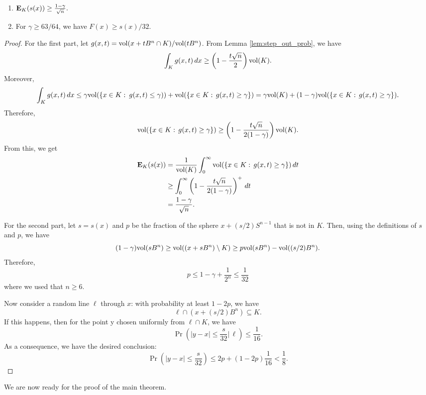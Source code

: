\begin{enumerate}
\item $\mathbf{E}_{K}(s(x))\ge\frac{1-\gamma}{\sqrt{n}}.$
\item For $\gamma\ge63/64$, we have $F(x)\ge s(x)/32.$
\end{enumerate}
\begin{proof}
For the first part, let $g(x,t)=\mathrm{vol}(x+tB^{n}\cap K)/\mathrm{vol}(tB^{n})$.
From Lemma \ref{lem:step_out_prob}, we have
\[
\int_{K}g(x,t)\,dx\ge\left(1-\frac{t\sqrt{n}}{2}\right)\mathrm{vol}(K).
\]
Moreover, 
\[
\int_{K}g(x,t)\,dx\le\gamma\mathrm{vol}(\{x\in K:\:g(x,t)\le\gamma))+\mathrm{vol}(\{x\in K:\,g(x,t)\ge\gamma\})=\gamma\mathrm{vol}(K)+(1-\gamma)\mathrm{vol}(\{x\in K:\,g(x,t)\ge\gamma\}).
\]
Therefore, 
\[
\mathrm{vol}(\{x\in K:\,g(x,t)\ge\gamma\})\ge\left(1-\frac{t\sqrt{n}}{2(1-\gamma)}\right)\mathrm{vol}(K).
\]
From this, we get 
\begin{align*}
\mathbf{E}_{K}(s(x)) & =\frac{1}{\mathrm{vol}(K)}\int^{\infty}_{0}\mathrm{vol}(\{x\in K:\,g(x,t)\ge\gamma\})\,dt\\
 & \ge\int^{\infty}_{0}\left(1-\frac{t\sqrt{n}}{2(1-\gamma)}\right)^{+}\,dt\\
 & =\frac{1-\gamma}{\sqrt{n}}.
\end{align*}

For the second part, let $s=s(x)$ and $p$ be the fraction of the
sphere $x+(s/2)S^{n-1}$ that is not in $K$. Then, using the definitions
of $s$ and $p$, we have
\[
(1-\gamma)\mathrm{vol}(sB^{n})\ge\mathrm{vol}((x+sB^{n})\setminus K)\ge p\mathrm{vol}(sB^{n})-\mathrm{vol}((s/2)B^{n}).
\]
Therefore,
\[
p\le1-\gamma+\frac{1}{2^{n}}\le\frac{1}{32}
\]
where we used that $n\ge6$. 

Now consider a random line $\ell$ through $x$: with probability
at least $1-2p$, we have 
\[
\ell\cap(x+(s/2)B^{n})\subseteq K.
\]
If this happens, then for the point y chosen uniformly from $\ell\cap K$,
we have 
\[
\Pr\left(|y-x|\le\frac{s}{32}\big|\,\ell\right)\le\frac{1}{16}.
\]
As a consequence, we have the desired conclusion: 
\[
\Pr\left(\left|y-x\right|\le\frac{s}{32}\right)\le2p+(1-2p)\frac{1}{16}<\frac{1}{8}.
\]
\end{proof}
We are now ready for the proof of the main theorem.
